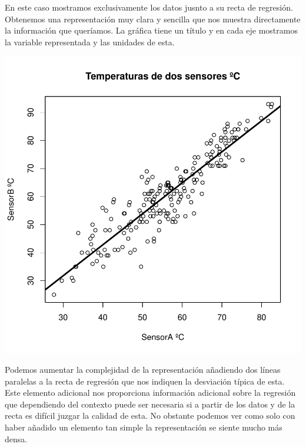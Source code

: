 \documentclass [a4paper] {article}
\begin{document}
En este caso mostramos exclusivamente los datos jusnto a su recta de regresión.
Obtenemos una representación muy clara y sencilla que nos muestra directamente la información que queríamos.
La gráfica tiene un título y en cada eje mostramos la variable representada y las unidades de esta.
\begin{center}
\includegraphics{entrega-temp_plot}
\end{center}
Podemos aumentar la complejidad de la representación añadiendo dos líneas paralelas a la recta de regresión que nos indiquen la desviación típica de esta.
Este elemento adicional nos proporciona información adicional sobre la regresión que dependiendo del contexto puede ser necesaria si a partir de los datos y de la recta es difícil juzgar la calidad de esta.
No obstante podemos ver como solo con haber añadido un elemento tan simple la representación se siente mucho más densa.
\end{document}
